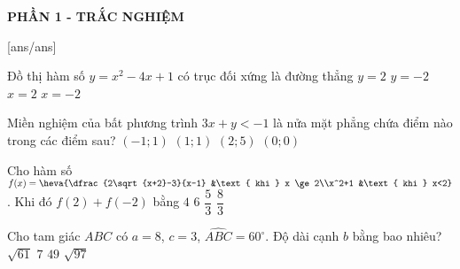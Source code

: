 

\begin{center}
	\textbf{PHẦN 1 - TRẮC NGHIỆM}
\end{center}
[ans/ans]


\begin{ex}%
	Đồ thị hàm số $y=x^2-4x+1$ có trục đối xứng là đường thẳng
	\choice
	{$y=2$}
	{$y=-2$}
	{\True $x=2$}
	{$x=-2$}
\end{ex}

\begin{ex}%
	Miền nghiệm của bất phương trình $3x+y<-1$ là nửa mặt phẳng chứa điểm nào trong các điểm sau?
	\choice
	{\True $(-1;1)$}
	{$(1;1)$}
	{$(2;5)$}
	{$(0;0)$}
\end{ex}

\begin{ex}%
	Cho hàm số $f(x)=\heva{\dfrac{2\sqrt{x+2}-3}{x-1} &\text{ khi } x \ge 2\\x^2+1 &\text{ khi } x<2}$. Khi đó $f(2)+f(-2)$ bằng
	\choice
	{$4$}
	{\True $6$}
	{$\dfrac{5}{3}$}
	{$\dfrac{8}{3}$}
\end{ex}

\begin{ex}%
	Cho tam giác $ABC$ có $a=8$, $c=3$, $\widehat{ABC}=60^{\circ}$. Độ dài cạnh $b$ bằng bao nhiêu?
	\choice
	{$\sqrt{61}$}
	{\True $7$}
	{$49$}
	{$\sqrt{97}$}
\end{ex}

